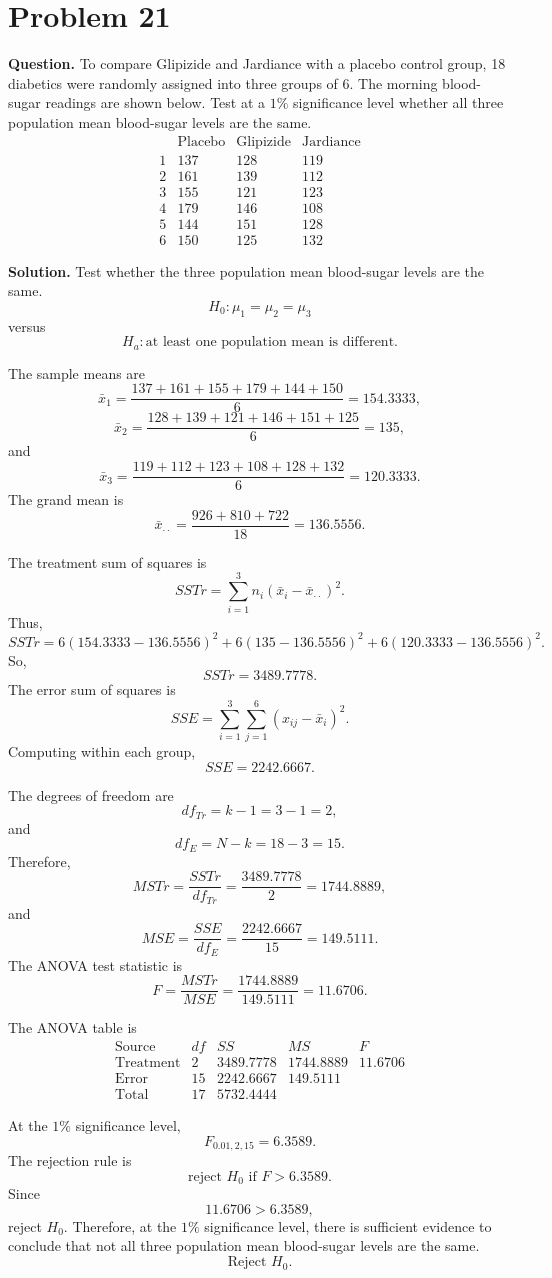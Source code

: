 \documentclass[11pt]{article}
\begin{document}
\newpage
\section*{Problem 21}

\textbf{Question.} To compare Glipizide and Jardiance with a placebo control group, 18 diabetics were randomly assigned into three groups of 6. The morning blood-sugar readings are shown below. Test at a $1\%$ significance level whether all three population mean blood-sugar levels are the same.
\[
\begin{array}{c|ccc}
& \text{Placebo} & \text{Glipizide} & \text{Jardiance}\\
\hline
1 & 137 & 128 & 119\\
2 & 161 & 139 & 112\\
3 & 155 & 121 & 123\\
4 & 179 & 146 & 108\\
5 & 144 & 151 & 128\\
6 & 150 & 125 & 132
\end{array}
\]

\textbf{Solution.} Test whether the three population mean blood-sugar levels are the same.
\[
H_0:\mu_1=\mu_2=\mu_3
\]
versus
\[
H_a:\text{at least one population mean is different}.
\]

The sample means are
\[
\bar x_1=\frac{137+161+155+179+144+150}{6}=154.3333,
\]
\[
\bar x_2=\frac{128+139+121+146+151+125}{6}=135,
\]
and
\[
\bar x_3=\frac{119+112+123+108+128+132}{6}=120.3333.
\]
The grand mean is
\[
\bar x_{\cdot\cdot}=\frac{926+810+722}{18}=136.5556.
\]

The treatment sum of squares is
\[
SSTr=\sum_{i=1}^{3}n_i(\bar x_i-\bar x_{\cdot\cdot})^2.
\]
Thus,
\[
SSTr=6(154.3333-136.5556)^2+6(135-136.5556)^2+6(120.3333-136.5556)^2.
\]
So,
\[
SSTr=3489.7778.
\]
The error sum of squares is
\[
SSE=\sum_{i=1}^{3}\sum_{j=1}^{6}(x_{ij}-\bar x_i)^2.
\]
Computing within each group,
\[
SSE=2242.6667.
\]

The degrees of freedom are
\[
df_{Tr}=k-1=3-1=2,
\]
and
\[
df_E=N-k=18-3=15.
\]
Therefore,
\[
MSTr=\frac{SSTr}{df_{Tr}}=\frac{3489.7778}{2}=1744.8889,
\]
and
\[
MSE=\frac{SSE}{df_E}=\frac{2242.6667}{15}=149.5111.
\]
The ANOVA test statistic is
\[
F=\frac{MSTr}{MSE}=\frac{1744.8889}{149.5111}=11.6706.
\]

The ANOVA table is
\[
\begin{array}{c|cccc}
\text{Source} & df & SS & MS & F\\
\hline
\text{Treatment} & 2 & 3489.7778 & 1744.8889 & 11.6706\\
\text{Error} & 15 & 2242.6667 & 149.5111 & \\
\text{Total} & 17 & 5732.4444 & &
\end{array}
\]

At the $1\%$ significance level,
\[
F_{0.01,2,15}=6.3589.
\]
The rejection rule is
\[
\text{reject }H_0\text{ if }F>6.3589.
\]
Since
\[
11.6706>6.3589,
\]
reject $H_0$. Therefore, at the $1\%$ significance level, there is sufficient evidence to conclude that not all three population mean blood-sugar levels are the same.
\[
\boxed{\text{Reject }H_0.}
\]
\end{document}
